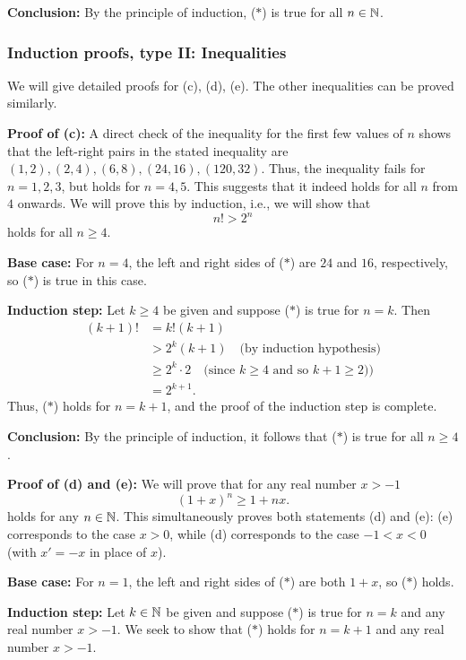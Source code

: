 \textbf{Conclusion:} By the principle of induction, 
($*$) is true for all $n\in\mathbb{N}$.  

\subsubsection{Induction proofs, type II: Inequalities}

We will give detailed proofs for (c), (d), (e). The other inequalities can
be proved similarly.

\medskip

\textbf{Proof of (c):}
A direct check of the inequality for the first few values of $n$ shows
that the left-right pairs in the stated inequality 
are $(1,2),(2,4),(6,8),(24,16),(120,32)$. Thus, the inequality
fails for $n=1,2,3$, but holds for $n=4,5$. This suggests that it indeed
holds for all $n$ from $4$ onwards. We will prove this by induction,
i.e., we will show that 
\[
n!>2^n
\tag{$*$}
\]
holds for all $n\ge4$.

\textbf{Base case:} For $n=4$, the left and right sides of ($*$) are 
$24$ and $16$, respectively, so ($*$) is true in this case. 

\textbf{Induction step:} Let $k\ge4$ be given and suppose 
($*$) is true for $n=k$. Then
\begin{align*}
(k+1)!&=k!(k+1)
\\
&>2^k(k+1)
\quad \text{(by induction hypothesis)}
\\
&\ge 2^k\cdot 2
\quad \text{(since $k\ge4$ and so $k+1\ge2$))}
\\
&=2^{k+1}.
\end{align*}
Thus, ($*$) holds for $n=k+1$, and the proof of the induction step is complete. 

\textbf{Conclusion:} By the principle of induction, 
it follows that ($*$) is true for all $n\ge4$.  

\bigskip

\textbf{Proof of (d) and (e):}
We will prove that for any real number $x>-1$  
\[
(1+x)^n\ge 1+nx.
\tag{$*$}
\]
holds for any $n\in\mathbb{N}$.
This simultaneously proves both statements (d) and (e): (e) corresponds
to the case $x>0$, while (d) corresponds to the case $-1<x<0$ (with
$x'=-x$ in place of $x$).

\textbf{Base case:} For $n=1$, the left and right sides of ($*$) are 
both $1+x$, so ($*$) holds.

\textbf{Induction step:} Let $k\in\mathbb{N}$ be given and suppose ($*$) is true
for $n=k$ and any real number $x>-1$.   We seek to show that ($*$) holds
for $n=k+1$ and any real number $x>-1$.

